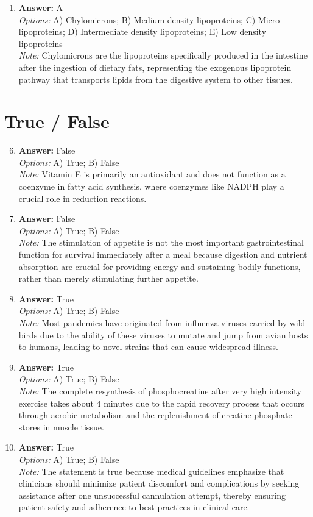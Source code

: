 \documentclass[12pt]{article}
\begin{document}
\begin{enumerate}[label=\arabic*.]
\item \textbf{Answer:} A
\\ \textit{Options:} A) Chylomicrons; B) Medium density lipoproteins; C) Micro lipoproteins; D) Intermediate density lipoproteins; E) Low density lipoproteins
\\ \textit{Note:} Chylomicrons are the lipoproteins specifically produced in the intestine after the ingestion of dietary fats, representing the exogenous lipoprotein pathway that transports lipids from the digestive system to other tissues.
\end{enumerate}

\section*{True / False}
\begin{enumerate}[label=\arabic*.]
\setcounter{enumi}{5}
\item \textbf{Answer:} False
\\ \textit{Options:} A) True; B) False
\\ \textit{Note:} Vitamin E is primarily an antioxidant and does not function as a coenzyme in fatty acid synthesis, where coenzymes like NADPH play a crucial role in reduction reactions.
\item \textbf{Answer:} False
\\ \textit{Options:} A) True; B) False
\\ \textit{Note:} The stimulation of appetite is not the most important gastrointestinal function for survival immediately after a meal because digestion and nutrient absorption are crucial for providing energy and sustaining bodily functions, rather than merely stimulating further appetite.
\item \textbf{Answer:} True
\\ \textit{Options:} A) True; B) False
\\ \textit{Note:} Most pandemics have originated from influenza viruses carried by wild birds due to the ability of these viruses to mutate and jump from avian hosts to humans, leading to novel strains that can cause widespread illness.
\item \textbf{Answer:} True
\\ \textit{Options:} A) True; B) False
\\ \textit{Note:} The complete resynthesis of phosphocreatine after very high intensity exercise takes about 4 minutes due to the rapid recovery process that occurs through aerobic metabolism and the replenishment of creatine phosphate stores in muscle tissue.
\item \textbf{Answer:} True
\\ \textit{Options:} A) True; B) False
\\ \textit{Note:} The statement is true because medical guidelines emphasize that clinicians should minimize patient discomfort and complications by seeking assistance after one unsuccessful cannulation attempt, thereby ensuring patient safety and adherence to best practices in clinical care.
\end{enumerate}
\end{document}
